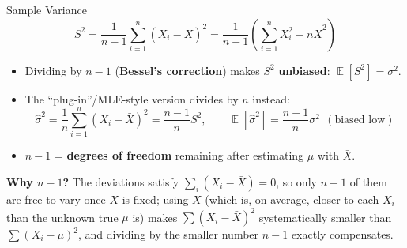 \documentclass[11pt,aspectratio=169]{beamer}
\newcommand{\E}{\operatorname{\mathbb{E}}}
\newcommand{\Xbar}{\bar{X}}
\begin{document}
\begin{frame}{Sample Variance}
\[
    S^2 = \frac{1}{n-1}\sum_{i=1}^n (X_i - \Xbar)^2
    = \frac{1}{n-1}\left(\sum_{i=1}^n X_i^2 - n \Xbar^2\right)
\]

\begin{itemize}
    \item Dividing by $n-1$ (\textbf{Bessel's correction}) makes $S^2$
          \textbf{unbiased}: $\E[S^2] = \sigma^2$.
    \item The ``plug-in''/MLE-style version divides by $n$ instead:
    \[
        \hat\sigma^2 = \frac{1}{n}\sum_{i=1}^n (X_i-\Xbar)^2 = \frac{n-1}{n}S^2,
        \qquad \E[\hat\sigma^2] = \frac{n-1}{n}\sigma^2 \ \ (\text{biased low})
    \]
    \item $n-1$ = \textbf{degrees of freedom} remaining after estimating
          $\mu$ with $\Xbar$.
\end{itemize}

\textbf{Why $n-1$?} The deviations satisfy $\sum_i (X_i-\Xbar)=0$, so only
$n-1$ of them are free to vary once $\Xbar$ is fixed; using $\Xbar$ (which
is, on average, closer to each $X_i$ than the unknown true $\mu$ is) makes
$\sum(X_i-\Xbar)^2$ systematically smaller than $\sum(X_i-\mu)^2$, and
dividing by the smaller number $n-1$ exactly compensates.
\end{frame}
\end{document}
